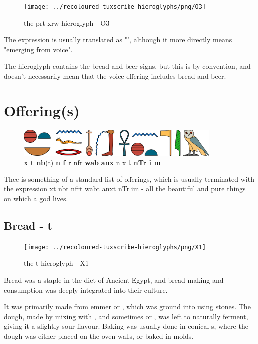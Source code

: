\begin{figure} [H]
	\centering
	\texttt{[image: ../recoloured-tuxscribe-hieroglyphs/png/O3]}
	\caption{the prt-xrw hieroglyph - O3}
\end{figure}

The expression  is usually translated as "", although it more directly means "emerging from voice".

The hieroglyph contains the bread and beer signs, but this is by convention, and doesn't necessarily mean that the voice offering includes bread and beer.

\section*{Offering(s)}

\begin{figure} [H]
	\centering
	\includegraphics[width=0.875\textwidth]{../images/xt-nb-nfr-wab-anxt-ntr-im}
	\caption{\textbf{x t nb}(t) \textbf{n f r} nfr \textbf{wab} \textbf{anx} n x \textbf{t nTr i m}}
\end{figure}

Thee is something of a standard list of offerings, which is usually terminated with the expression xt nbt nfrt wabt anxt nTr im - all the beautiful and pure things on which a god lives.

\subsection*{Bread - t}

\begin{figure} [H]
	\centering
	\texttt{[image: ../recoloured-tuxscribe-hieroglyphs/png/X1]}
	\caption{the t hieroglyph - X1}
\end{figure}

Bread was a staple in the diet of Ancient Egypt, and bread making and consumption was deeply integrated into their culture.

It was primarily made from emmer  or , which was ground into  using stones. The dough, made by mixing with , and sometimes  or , was left to naturally ferment, giving it a slightly sour flavour. Baking was usually done in conical  s, where the dough was either placed on the oven walls, or baked in molds.

